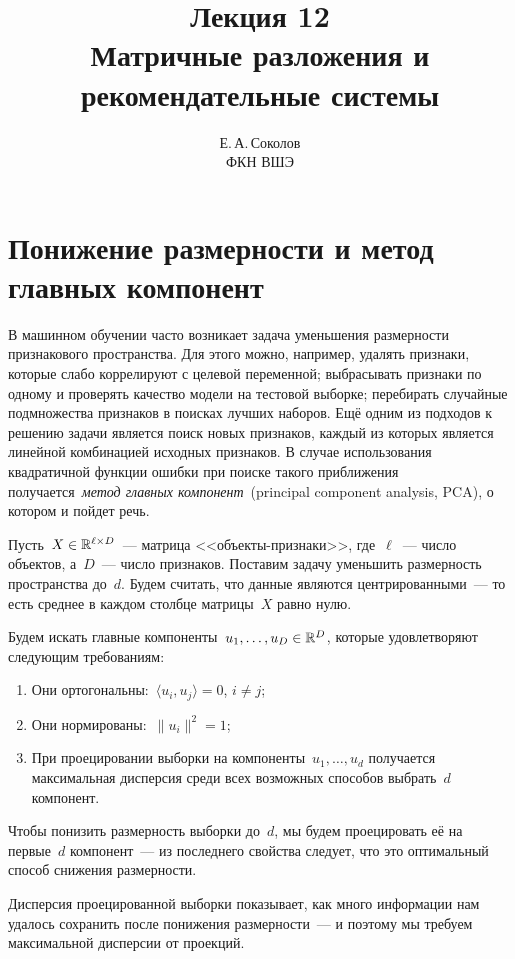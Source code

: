 \documentclass[12pt,fleqn]{article}
\begin{document}
\title{Лекция 12\\Матричные разложения и рекомендательные системы}
\author{Е.\,А.\,Соколов\\ФКН ВШЭ}
\maketitle

\section{Понижение размерности и метод главных компонент}

В машинном обучении часто возникает задача уменьшения размерности
признакового пространства.
Для этого можно, например, удалять признаки, которые слабо коррелируют с целевой переменной;
выбрасывать признаки по одному и проверять качество модели на тестовой выборке;
перебирать случайные подмножества признаков в поисках лучших наборов.
Ещё одним из подходов к решению задачи является поиск новых признаков,
каждый из которых является линейной комбинацией исходных признаков.
В случае использования квадратичной функции ошибки при поиске
такого приближения получается~\emph{метод главных компонент}~(principal
component analysis, PCA),
о котором и пойдет речь.

Пусть~$X \in \RR^{\ell \times D}$~--- матрица <<объекты-признаки>>,
где~$\ell$~--- число объектов, а~$D$~--- число признаков.
Поставим задачу уменьшить размерность пространства до~$d$.
Будем считать, что данные являются центрированными~--- то есть среднее
в каждом столбце матрицы~$X$ равно нулю.

Будем искать главные компоненты~$u_1, \dots, u_D \in \mathbb{R}^D$, которые удовлетворяют
следующим требованиям:
\begin{enumerate}
    \item Они ортогональны:~$\langle u_i, u_j \rangle = 0$, $i \neq j$;
    \item Они нормированы:~$\|u_i\|^2 = 1$;
    \item При проецировании выборки на компоненты~$u_1, \dots, u_d$ получается
        максимальная дисперсия среди всех возможных способов выбрать~$d$ компонент.
\end{enumerate}

Чтобы понизить размерность выборки до~$d$, мы будем проецировать её на первые~$d$ компонент~---
из последнего свойства следует, что это оптимальный способ снижения размерности.

Дисперсия проецированной выборки показывает, как много информации нам удалось сохранить после
понижения размерности~--- и поэтому мы требуем максимальной дисперсии от проекций.
\end{document}
